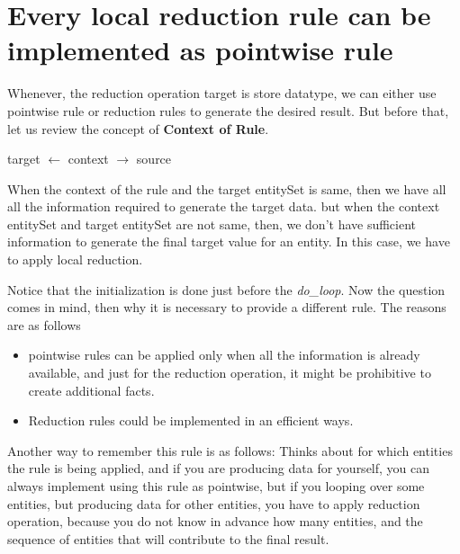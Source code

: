 \section { Every local reduction rule can be implemented as pointwise rule }
%
Whenever, the reduction operation target is store datatype, we can either
use pointwise rule or reduction rules to generate the desired result. But before
that, let us review the concept of {\bf Context of Rule}. 
\begin{center}
target $\leftarrow$ context $\rightarrow$ source 
\end{center}
When the context of the rule and the target entitySet is same, then we have all 
all the information required to generate the target data. but when the
context entitySet and target entitySet are not same, then, we don't have
sufficient information to generate the final target value for an entity. In
this case, we have to apply local reduction. 

%
%
%
%

Notice that the initialization is done just before the {\em do\_loop}. Now
the question comes in mind, then why it is necessary to provide a different
rule. The reasons are as follows
\begin{itemize}
\item pointwise rules can be applied only when all the information is 
already available, and just for the reduction operation, it might be prohibitive
to create additional facts.
\item Reduction rules could be implemented in an efficient ways.
\end{itemize}
%
\par Another way to remember this rule is as follows: Thinks about for which
entities the rule is being applied, and if you are producing data for yourself,
you can always implement using this rule as pointwise, but if you looping over
some entities, but producing data for other entities, you have to apply 
reduction operation, because you do not know in advance how many entities, and
the sequence of entities that will contribute to the final result.

